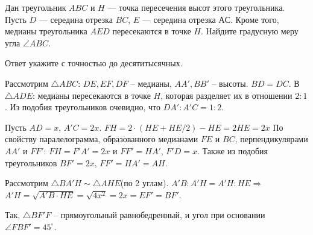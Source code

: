 
Дан треугольник $ABC$ и $H$ — точка пересечения высот этого треугольника. 
Пусть $D$ — середина отрезка $BC$, $E$ — середина отрезка $АС$. 
Кроме того, медианы треугольника $AED$ пересекаются в точке $H$. Найдите градусную меру угла $\angle ABC$. 

Ответ укажите с точностью до десятитысячных.

\solutionSection


Рассмотрим $\triangle ABC$: $DE, EF, DF$ -- медианы, $AA', BB'$ -- высоты. $BD = DC$. В~$\triangle ADE$: медианы пересекаются в точке $H$, которая разделяет их в отношении $2:1$. Из подобия треугольников очевидно, что $DA':A'C = 1:2$. 

Пусть $AD = x$, $A'C = 2x$. $FH = 2 \cdot (HE + HE/2) - HE = 2HE = 2x$ По свойству паралелограмма, образованного медианами $FE$ и $BC$, перпендикулярами $AA'$ и $FF'$: $FH = F'A' = 2x$ и $FF'=HA'$, $F'D = x$. Также из подобия треугольников $BF' = 2x$, $FF'=HA'=AH$. 

Рассмотрим $\triangle BA'H\sim\triangle AHE$(по 2 углам). $A'B:A'H=A'H:HE \Rightarrow$ \linebreak $A'H = \sqrt{A'B\cdot HE} = \sqrt{4x^2} = 2x = EF'=BF'$. 

Так, $\triangle BF'F$ -- прямоугольный равнобедренный, и угол при основании \linebreak $\angle FBF' = 45^\circ$.\\

